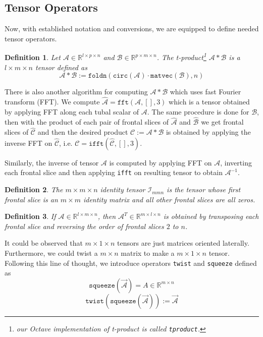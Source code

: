 \documentclass[twoside]{article}
\newtheorem{defn}{Definition}
\newcommand{\code}[1]{\texttt{#1}}
\begin{document}
\begin{multicols}{2}
\subsection{Tensor Operators}
Now, with established notation and conversions, we are equipped to define needed tensor operators.

\begin{defn} Let $\mathcal{A} \in \mathbb{R}^{l \times p \times n}$ and $\mathcal{B} \in \mathbb{R}^{p \times m \times n}$. The t-product\footnote{our Octave implementation of t-product is called \code{tproduct}.} $\mathcal{A} \ast \mathcal{B}$ is a $l \times m \times n$ tensor defined as
\[ \mathcal{A} \ast \mathcal{B} := \code{foldn}(\code{circ}(\mathcal{A}) \cdot \code{matvec}(\mathcal{B}) ,n) \]
\end{defn}

There is also another algorithm for computing $\mathcal{A} \ast \mathcal{B}$ which uses fast Fourier transform (FFT). We compute $\hat{\mathcal{A}} = \code{fft}(\mathcal{A},[],3)$ which is a tensor obtained by applying FFT along each tubal scalar of $\mathcal{A}$. The same procedure is done for $\mathcal{B}$, then with the product of each pair of frontal slices of $\hat{\mathcal{A}}$ and $\hat{\mathcal{B}}$ we get frontal slices of $\hat{\mathcal{C}}$ and then the desired product $\mathcal{C} := \mathcal{A} \ast \mathcal{B}$ is obtained by applying the inverse FFT on $\hat{\mathcal{C}}$, i.e. $\mathcal{C} = \code{ifft}(\hat{\mathcal{C}},[],3)$.

Similarly, the inverse of tensor $\mathcal{A}$ is computed by applying FFT on $\mathcal{A}$, inverting each frontal slice and then applying \code{ifft} on resulting tensor to obtain $\mathcal{A}^{-1}$.

\begin{defn} The $m \times m \times n$ identity tensor $\mathcal{I}_{mmn}$ is the tensor whose first frontal slice is an $m \times m$ identity matrix and all other frontal slices are all zeros. 
\end{defn}

\begin{defn} If $\mathcal{A} \in \mathbb{R}^{l \times m \times n}$, then $\mathcal{A}^T \in \mathbb{R}^{m \times l \times n}$ is obtained by transposing each frontal slice and reversing the order of frontal slices $2$ to $n$.
\end{defn}

It could be observed that $m \times 1 \times n$ tensors are just matrices oriented laterally. Furthermore, we could twist a $m \times n$ matrix to make a $m \times 1 \times n$ tensor. Following this line of thought, we introduce operators \code{twist} and \code{squeeze} defined as
\[ \code{squeeze}(\overrightarrow{\mathcal{A}}) = A \in \mathbb{R}^{m \times n} \]
\[ \code{twist}(\code{squeeze}(\overrightarrow{\mathcal{A}})) := \overrightarrow{\mathcal{A}} \]


\end{multicols}
\end{document}
